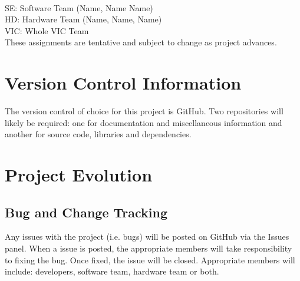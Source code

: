 \documentclass [12pt]{article}
\begin{document}
\\
SE: Software Team (Name, Name Name)\\
HD: Hardware Team (Name, Name, Name) \\
VIC: Whole VIC Team\\

 These assignments are tentative and subject to change as project advances. 





\section{Version Control Information}
The version control of choice for this project is GitHub. Two repositories will likely be required: one for documentation and miscellaneous information and another for source code, libraries and dependencies. 





\section{Project Evolution}

\subsection{Bug and Change Tracking}
Any issues with the project (i.e. bugs) will  be posted on GitHub via the Issues panel. When a issue is posted, the appropriate members will take responsibility to fixing the bug. Once fixed, the issue will be closed. Appropriate members will include: developers, software team, hardware team or both. 
\end{document}
